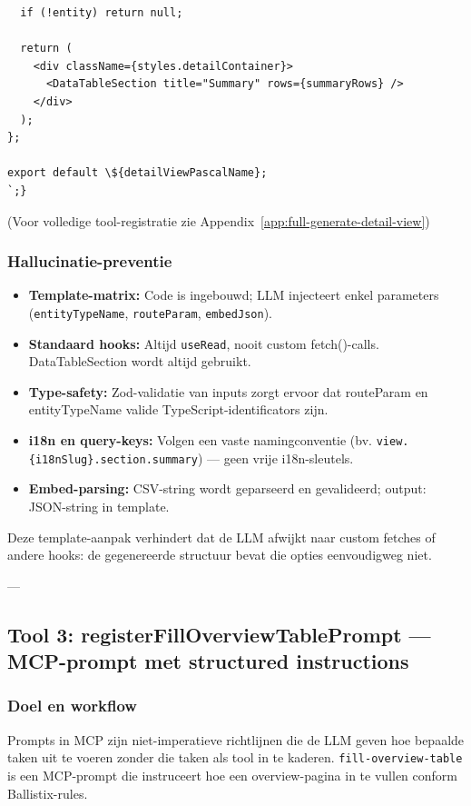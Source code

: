 \begin{verbatim}
  if (!entity) return null;

  return (
    <div className={styles.detailContainer}>
      <DataTableSection title="Summary" rows={summaryRows} />
    </div>
  );
};

export default \${detailViewPascalName};
`;}
\end{verbatim}

\noindent
(Voor volledige tool-registratie zie Appendix~\ref{app:full-generate-detail-view})

\subsubsection{Hallucinatie-preventie}

\begin{itemize}
  \item \textbf{Template-matrix:} Code is ingebouwd; LLM injecteert enkel parameters (\texttt{entityTypeName}, \texttt{routeParam}, \texttt{embedJson}).
  \item \textbf{Standaard hooks:} Altijd \texttt{useRead}, nooit custom fetch()-calls. DataTableSection wordt altijd gebruikt.
  \item \textbf{Type-safety:} Zod-validatie van inputs zorgt ervoor dat routeParam en entityTypeName valide TypeScript-identificators zijn.
  \item \textbf{i18n en query-keys:} Volgen een vaste namingconventie (bv. \texttt{view.\{i18nSlug\}.section.summary}) — geen vrije i18n-sleutels.
  \item \textbf{Embed-parsing:} CSV-string wordt geparseerd en gevalideerd; output: JSON-string in template.
\end{itemize}

Deze template-aanpak verhindert dat de LLM afwijkt naar custom fetches of andere hooks: de gegenereerde structuur bevat die opties eenvoudigweg niet.

---

\subsection{Tool 3: registerFillOverviewTablePrompt — MCP-prompt met structured instructions}

\subsubsection{Doel en workflow}

Prompts in MCP zijn niet-imperatieve richtlijnen die de LLM geven hoe bepaalde taken uit te voeren zonder die taken als tool in te kaderen. \texttt{fill-overview-table} is een MCP-prompt die instruceert hoe een overview-pagina in te vullen conform Ballistix-rules.

